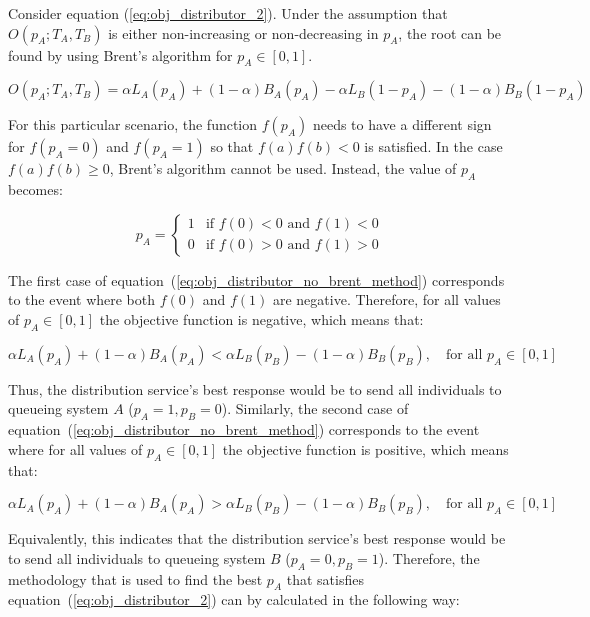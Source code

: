 Consider equation (\ref{eq:obj_distributor_2}).
Under the assumption that \(O(p_A; T_A, T_B)\) is either non-increasing or
non-decreasing in \(p_A\), the root can be found by using Brent's algorithm
for \(p_A \in [0, 1]\).

\begin{equation*}
    O(p_A; T_A, T_B) = \alpha L_A(p_A) + (1 - \alpha) B_A(p_A) -
    \alpha L_B(1 - p_A) - (1 - \alpha)B_B(1 - p_A)
\end{equation*}

For this particular scenario, the function \(f(p_A)\) needs to have a different
sign for \(f(p_A = 0)\) and \(f(p_A = 1)\) so that \(f(a)f(b) < 0\) is
satisfied.
In the case \(f(a)f(b) \geq 0\), Brent's algorithm cannot be used.
Instead, the value of \(p_A\) becomes:

\begin{equation}\label{eq:obj_distributor_no_brent_method}
    p_A = \begin{cases}
        1 & \text{if } f(0) < 0 \text{ and } f(1) < 0 \\
        0 & \text{if } f(0) > 0 \text{ and } f(1) > 0
    \end{cases}
\end{equation}

The first case of equation~(\ref{eq:obj_distributor_no_brent_method})
corresponds to the event where both \(f(0)\) and \(f(1)\) are negative.
Therefore, for all values of \(p_A \in [0, 1]\) the objective function is
negative, which means that:

\[
    \alpha L_A(p_A) + (1 - \alpha) B_A(p_A) <
    \alpha L_B(p_B) - (1 - \alpha) B_B(p_B), \quad \text{for all } p_A \in [0,1]
\]

Thus, the distribution service's best response would be to send all individuals
to queueing system \(A\) (\(p_A=1, p_B=0\)).
Similarly, the second case of
equation~(\ref{eq:obj_distributor_no_brent_method}) corresponds to the event
where for all values of \(p_A \in [0, 1]\) the objective function is
positive, which means that:

\[
    \alpha L_A(p_A) + (1 - \alpha) B_A(p_A) >
    \alpha L_B(p_B) - (1 - \alpha) B_B(p_B), \quad \text{for all } p_A \in [0,1]
\]

Equivalently, this indicates that the distribution service's best response
would be to send all individuals to queueing system \(B\) (\(p_A=0, p_B=1\)).
Therefore, the methodology that is used to find the best \(p_A\) that satisfies
equation~(\ref{eq:obj_distributor_2}) can by calculated in the following way:

